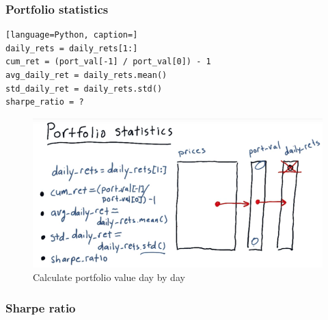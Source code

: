 \documentclass[12pt]{article}
\begin{document}
\subsubsection{Portfolio statistics}

\begin{lstlisting}[language=Python, caption=]
daily_rets = daily_rets[1:]
cum_ret = (port_val[-1] / port_val[0]) - 1
avg_daily_ret = daily_rets.mean()
std_daily_ret = daily_rets.std()
sharpe_ratio = ?
\end{lstlisting}

\begin{figure}[!ht]
\centering
\includegraphics[scale=0.4]{fig/fig20}
\caption{Calculate portfolio value day by day}
\end{figure}

\subsubsection{Sharpe ratio}  
\end{document}
